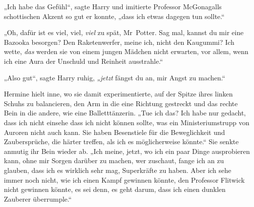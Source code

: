 „Ich habe das Gefühl“, sagte Harry und imitierte Professor McGonagalls schottischen Akzent so gut er konnte, „dass ich etwas dagegen tun sollte.“

„Oh, dafür ist es viel, viel, \emph{viel} zu spät, Mr~Potter. Sag mal, kannst du mir eine Bazooka besorgen? Den Raketenwerfer, meine ich, nicht den Kaugummi? Ich wette, \emph{das} werden sie von einem jungen Mädchen nicht erwarten, vor allem, wenn ich eine Aura der Unschuld und Reinheit ausstrahle.“

„Also gut“, sagte Harry ruhig, \emph{„jetzt} fängst du an, mir Angst zu machen.“

Hermine hielt inne, wo sie damit experimentierte, auf der Spitze ihres linken Schuhs zu balancieren, den Arm in die eine Richtung gestreckt und das rechte Bein in die andere, wie eine Balletttänzerin.
„Tue ich das? Ich habe nur gedacht, dass ich nicht einsehe dass ich nicht können sollte, was ein Ministeriumstrupp von Auroren nicht auch kann. Sie haben Besenstiele für die Beweglichkeit und Zaubersprüche, die härter treffen, als ich es möglicherweise könnte.“
Sie senkte anmutig ihr Bein wieder ab.
„Ich meine, jetzt, wo ich ein paar Dinge ausprobieren kann, ohne mir Sorgen darüber zu machen, wer zuschaut, fange ich an zu glauben, dass ich es wirklich sehr mag, Superkräfte zu haben. Aber ich sehe immer noch nicht, wie ich einen Kampf gewinnen könnte, den Professor Flitwick nicht gewinnen könnte, es sei denn, es geht darum, dass ich einen dunklen Zauberer überrumple.“

